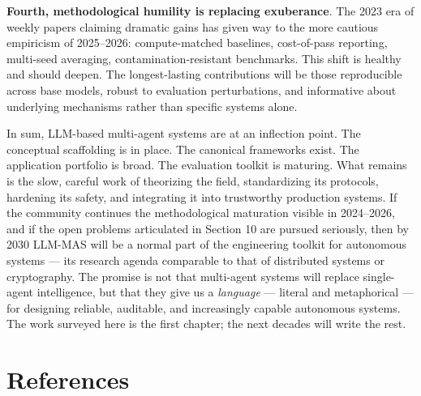 \textbf{Fourth, methodological humility is replacing exuberance}. The 2023 era of weekly papers claiming dramatic gains has given way to the more cautious empiricism of 2025--2026: compute-matched baselines, cost-of-pass reporting, multi-seed averaging, contamination-resistant benchmarks. This shift is healthy and should deepen. The longest-lasting contributions will be those reproducible across base models, robust to evaluation perturbations, and informative about underlying mechanisms rather than specific systems alone.

In sum, LLM-based multi-agent systems are at an inflection point. The conceptual scaffolding is in place. The canonical frameworks exist. The application portfolio is broad. The evaluation toolkit is maturing. What remains is the slow, careful work of theorizing the field, standardizing its protocols, hardening its safety, and integrating it into trustworthy production systems. If the community continues the methodological maturation visible in 2024--2026, and if the open problems articulated in Section 10 are pursued seriously, then by 2030 LLM-MAS will be a normal part of the engineering toolkit for autonomous systems --- its research agenda comparable to that of distributed systems or cryptography. The promise is not that multi-agent systems will replace single-agent intelligence, but that they give us a \emph{language} --- literal and metaphorical --- for designing reliable, auditable, and increasingly capable autonomous systems. The work surveyed here is the first chapter; the next decades will write the rest.

\section{References}\label{references}


